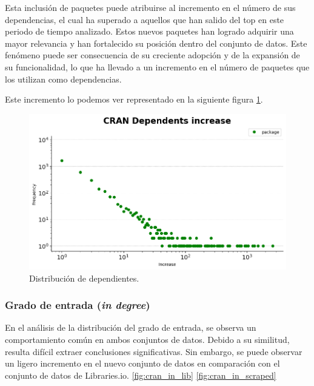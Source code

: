 Esta inclusión de paquetes puede atribuirse al incremento en el número de sus dependencias,
el cual ha superado a aquellos que han salido del top en este periodo de tiempo analizado.
Estos nuevos paquetes han logrado adquirir una mayor relevancia y han fortalecido su posición
dentro del conjunto de datos. Este fenómeno puede ser consecuencia de su creciente adopción y
de la expansión de su funcionalidad, lo que ha llevado a un incremento en el número de paquetes
que los utilizan como dependencias.

Este incremento lo podemos ver representado en la siguiente figura \ref{fig:cran_dependents_dist}.

\begin{figure}[ht!]
    \begin{center}
        \includegraphics[width=1\textwidth]{img/cran/dependents_dist.png}
        \caption{Distribución de dependientes.}
        \label{fig:cran_dependents_dist}
    \end{center}
\end{figure}

\subsubsection{Grado de entrada (\textit{in degree})}


En el análisis de la distribución del grado de entrada, se observa un comportamiento común
en ambos conjuntos de datos. Debido a su similitud, resulta difícil extraer conclusiones
significativas. Sin embargo, se puede observar un ligero incremento en el nuevo conjunto de
datos en comparación con el conjunto de datos de Libraries.io. \ref{fig:cran_in_lib} \ref{fig:cran_in_scraped}

